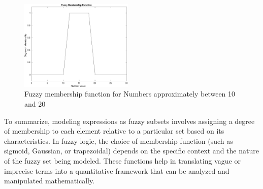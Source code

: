 \begin{figure}[H]
	\centering
	\includegraphics[width=0.48\textwidth]{../Problem 7/number_range.pdf}
	\caption{Fuzzy membership function for Numbers approximately between 10 and 20}	
\end{figure}

To summarize, modeling expressions as fuzzy subsets involves assigning a degree of membership to each element relative to a particular set based on its characteristics. 
In fuzzy logic, the choice of membership function (such as sigmoid, Gaussian, or trapezoidal) depends on the specific context and the nature of the fuzzy set being modeled. These functions help in translating vague or imprecise terms into a quantitative framework that can be analyzed and manipulated mathematically.
\vspace{3mm}